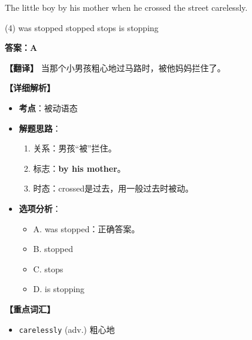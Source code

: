 \documentclass[11pt, a4paper]{article}
\newcommand{\analysis}[4]{
    \begin{solutionbox}
        \textbf{答案：#1}
        
        \textbf{【翻译】} #2
        
        \textbf{【详细解析】}
        #3
        
        \textbf{【重点词汇】}
        #4
    \end{solutionbox}
}
\newcommand{\blank}{\underline{\hspace{1.5cm}}}
\begin{document}
\begin{questions}
    \item The little boy \blank by his mother when he crossed the street carelessly.
    \begin{tasks}(4)
        \task was stopped \task stopped \task stops \task is stopping
    \end{tasks}
    \analysis{A}{当那个小男孩粗心地过马路时，被他妈妈拦住了。}{
        \begin{itemize}
            \item \textbf{考点}：被动语态
            \item \textbf{解题思路}：
                \begin{enumerate}
                    \item 关系：男孩“被”拦住。
                    \item 标志：\textbf{by his mother}。
                    \item 时态：crossed是过去，用一般过去时被动。
                \end{enumerate}
            \item \textbf{选项分析}：
                \begin{itemize}
                    \item A. was stopped：正确答案。
                    \item B. stopped
                    \item C. stops
                    \item D. is stopping
                \end{itemize}
        \end{itemize}
    }{
        \begin{itemize}
            \item \texttt{carelessly} (adv.) 粗心地
        \end{itemize}
    }


\end{questions}
\end{document}

